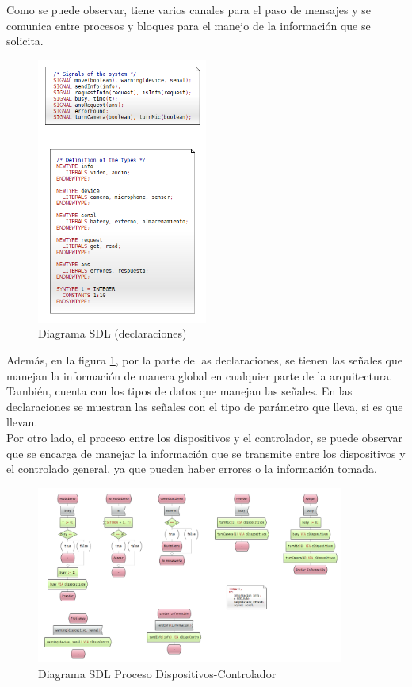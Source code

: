 Como se puede observar, tiene varios canales para el paso de mensajes y se comunica entre procesos y bloques para el manejo de la información que se solicita.

\begin{figure}[h]
    \centering
    \includegraphics[width=0.5\textwidth]{images/SDL_GeneralDeclaraciones.png}
    \caption{Diagrama SDL (declaraciones)}
    \label{SDL_GeneralDeclaraciones}
\end{figure}

\pagebreak

Además, en la figura \ref{SDL_GeneralDeclaraciones}, por la parte de las declaraciones, se tienen las señales que manejan la información de manera global en cualquier parte de la arquitectura. También, cuenta con los tipos de datos que manejan las señales. En las declaraciones se muestran las señales con el tipo de parámetro que lleva, si es que llevan. \\

Por otro lado, el proceso entre los dispositivos y el controlador, se puede observar que se encarga de manejar la información que se transmite entre los dispositivos y el controlado general, ya que pueden haber errores o la información tomada.

\begin{figure}[h]
    \centering
    \includegraphics[width=0.9\textwidth]{images/SDL_ProcesoDipoContro.png}
    \caption{Diagrama SDL Proceso Dispositivos-Controlador}
    \label{SDL_PdispoContro}
\end{figure}

